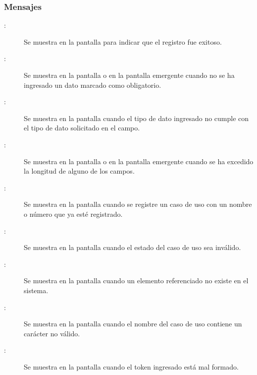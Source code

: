 \subsubsection{Mensajes}

	
\begin{description}
	\item[:] Se muestra en la pantalla  para indicar que el registro fue exitoso.
	\item[:] Se muestra en la pantalla  o en la pantalla emergente  cuando no se ha ingresado un dato marcado como obligatorio.
	\item[:] Se muestra en la pantalla  cuando el tipo de dato ingresado no cumple con el tipo de dato solicitado en el campo.
	\item[:] Se muestra en la pantalla  o en la pantalla emergente  cuando se ha excedido la longitud de alguno de los campos.
	\item[:] Se muestra en la pantalla  cuando se registre un caso de uso con un nombre o número que ya esté registrado.
	\item[:] Se muestra en la pantalla  cuando el estado del caso de uso sea inválido.
	\item[:] Se muestra en la pantalla  cuando un elemento referenciado no existe en el sistema.
	\item[:] Se muestra en la pantalla  cuando el nombre del caso de uso contiene un carácter no válido.
	\item[:] Se muestra en la pantalla  cuando el token ingresado está mal formado.
\end{description}
